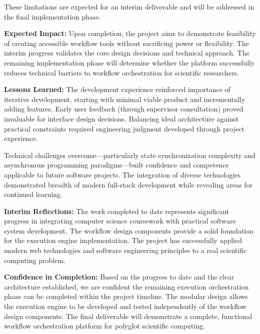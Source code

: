 \documentclass[12pt]{article}
\begin{document}
\hspace{\parindent}These limitations are expected for an interim deliverable and will be addressed in the final implementation phase.

\hspace{\parindent}\textbf{Expected Impact:} Upon completion, the project aims to demonstrate feasibility of creating accessible workflow tools without sacrificing power or flexibility. The interim progress validates the core design decisions and technical approach. The remaining implementation phase will determine whether the platform successfully reduces technical barriers to workflow orchestration for scientific researchers.

\hspace{\parindent}\textbf{Lessons Learned:} The development experience reinforced importance of iterative development, starting with minimal viable product and incrementally adding features. Early user feedback (through supervisor consultation) proved invaluable for interface design decisions. Balancing ideal architecture against practical constraints required engineering judgment developed through project experience.

Technical challenges overcome—particularly state synchronization complexity and asynchronous programming paradigms—built confidence and competence applicable to future software projects. The integration of diverse technologies demonstrated breadth of modern full-stack development while revealing areas for continued learning.

\hspace{\parindent}\textbf{Interim Reflections:} The work completed to date represents significant progress in integrating computer science coursework with practical software system development. The workflow design components provide a solid foundation for the execution engine implementation. The project has successfully applied modern web technologies and software engineering principles to a real scientific computing problem.

\hspace{\parindent}\textbf{Confidence in Completion:} Based on the progress to date and the clear architecture established, we are confident the remaining execution orchestration phase can be completed within the project timeline. The modular design allows the execution engine to be developed and tested independently of the workflow design components. The final deliverable will demonstrate a complete, functional workflow orchestration platform for polyglot scientific computing.
\end{document}
